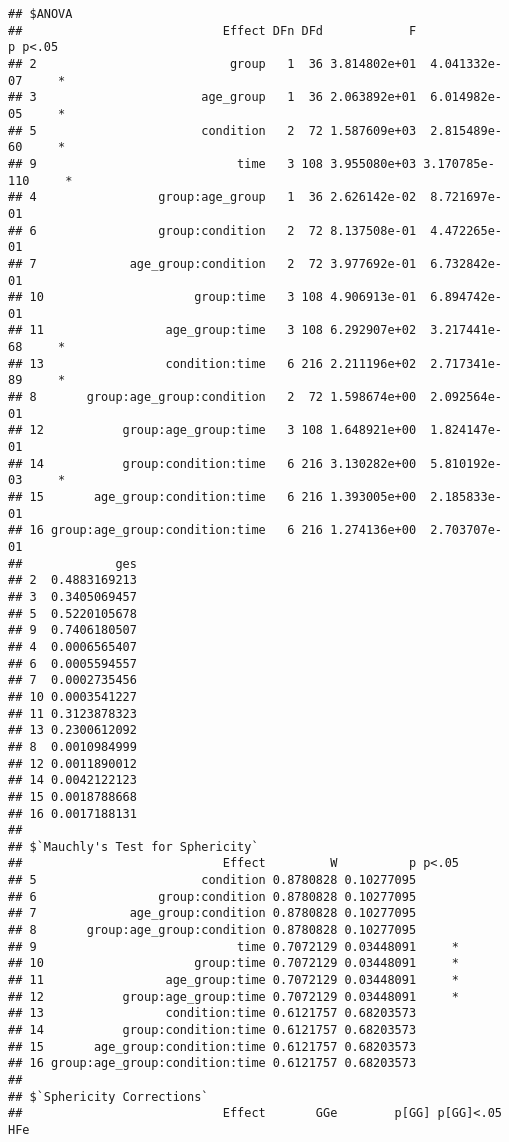\documentclass[]{article}
\begin{document}
\begin{verbatim}
## $ANOVA
##                            Effect DFn DFd            F             p p<.05
## 2                           group   1  36 3.814802e+01  4.041332e-07     *
## 3                       age_group   1  36 2.063892e+01  6.014982e-05     *
## 5                       condition   2  72 1.587609e+03  2.815489e-60     *
## 9                            time   3 108 3.955080e+03 3.170785e-110     *
## 4                 group:age_group   1  36 2.626142e-02  8.721697e-01      
## 6                 group:condition   2  72 8.137508e-01  4.472265e-01      
## 7             age_group:condition   2  72 3.977692e-01  6.732842e-01      
## 10                     group:time   3 108 4.906913e-01  6.894742e-01      
## 11                 age_group:time   3 108 6.292907e+02  3.217441e-68     *
## 13                 condition:time   6 216 2.211196e+02  2.717341e-89     *
## 8       group:age_group:condition   2  72 1.598674e+00  2.092564e-01      
## 12           group:age_group:time   3 108 1.648921e+00  1.824147e-01      
## 14           group:condition:time   6 216 3.130282e+00  5.810192e-03     *
## 15       age_group:condition:time   6 216 1.393005e+00  2.185833e-01      
## 16 group:age_group:condition:time   6 216 1.274136e+00  2.703707e-01      
##             ges
## 2  0.4883169213
## 3  0.3405069457
## 5  0.5220105678
## 9  0.7406180507
## 4  0.0006565407
## 6  0.0005594557
## 7  0.0002735456
## 10 0.0003541227
## 11 0.3123878323
## 13 0.2300612092
## 8  0.0010984999
## 12 0.0011890012
## 14 0.0042122123
## 15 0.0018788668
## 16 0.0017188131
## 
## $`Mauchly's Test for Sphericity`
##                            Effect         W          p p<.05
## 5                       condition 0.8780828 0.10277095      
## 6                 group:condition 0.8780828 0.10277095      
## 7             age_group:condition 0.8780828 0.10277095      
## 8       group:age_group:condition 0.8780828 0.10277095      
## 9                            time 0.7072129 0.03448091     *
## 10                     group:time 0.7072129 0.03448091     *
## 11                 age_group:time 0.7072129 0.03448091     *
## 12           group:age_group:time 0.7072129 0.03448091     *
## 13                 condition:time 0.6121757 0.68203573      
## 14           group:condition:time 0.6121757 0.68203573      
## 15       age_group:condition:time 0.6121757 0.68203573      
## 16 group:age_group:condition:time 0.6121757 0.68203573      
## 
## $`Sphericity Corrections`
##                            Effect       GGe        p[GG] p[GG]<.05       HFe

\end{verbatim}
\end{document}
